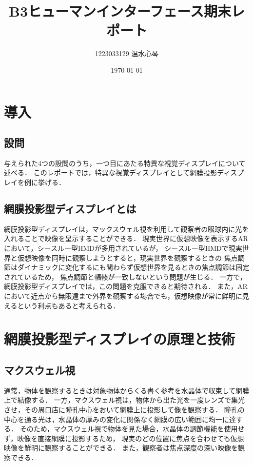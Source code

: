 \documentclass[dvipdfmx]{ujarticle}
\begin{document}

\title{B3ヒューマンインターフェース期末レポート}
\author{1223033129 温水心琴}
\date{\today}

\maketitle


\section{導入}
\subsection{設問}
与えられた4つの設問のうち，一つ目にあたる特異な視覚ディスプレイについて述べる．
このレポートでは，特異な視覚ディスプレイとして網膜投影ディスプレイを例に挙げる．

\subsection{網膜投影型ディスプレイとは}
網膜投影型ディスプレイは，マックスウェル視を利用して観察者の眼球内に光を入れることで映像を呈示することができる．
現実世界に仮想映像を表示するARにおいて，シースルー型HMDが多用されているが，
シースルー型HMDで現実世界と仮想映像を同時に観察しようとすると，現実世界を観察するときの
焦点調節はダイナミックに変化するにも関わらず仮想世界を見るときの焦点調節は固定されているため，
焦点調節と輻輳が一致しないという問題が生じる．
一方で，網膜投影型ディスプレイでは，この問題を克服できると期待される．
また，ARにおいて近点から無限遠まで外界を観察する場合でも，仮想映像が常に鮮明に見えるという利点もあると考えられる．

\cite{3DIC2000}

\section{網膜投影型ディスプレイの原理と技術}
\subsection{マクスウェル視}
通常，物体を観察するときは対象物体からくる書く参考を水晶体で収束して網膜上で結像する．
一方，マクスウェル視は，物体から出た光を一度レンズで集光させ，その周口店に瞳孔中心をおいて網膜上に投影して像を観察する．
瞳孔の中心を通る光は，水晶体の厚みの変化に関係なく網膜の広い範囲に均一に達する．
そのため，マクスウェル視で物体を見た場合，水晶体の調節機能を使用せず，映像を直接網膜に投影するため，
現実のどの位置に焦点を合わせても仮想映像を鮮明に観察することができる．
また，観察者は焦点深度の深い映像を観察できる．
\end{document}
